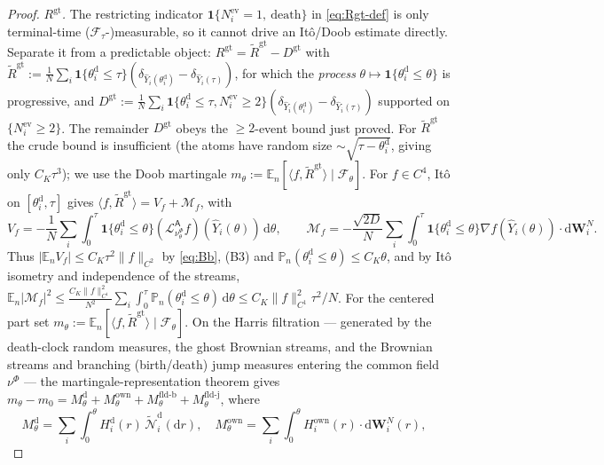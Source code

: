 \documentclass[a4paper,fleqn]{cas-sc}
\newcommand{\mhyphen}{\text{-}}
\theoremstyle{definition}
\theoremstyle{remark}
\begin{document}
\begin{proof}
\emph{$R^{\mathrm{gt}}$.} The restricting indicator $\mathbf 1\{N^{\mathrm{ev}}_i=1,\ \text{death}\}$
in \eqref{eq:Rgt-def} is only terminal-time ($\mathcal F_\tau$-)measurable, so it cannot drive
an It\^o/Doob estimate directly. Separate it from a predictable object:
$R^{\mathrm{gt}}=\widetilde R^{\mathrm{gt}}-D^{\mathrm{gt}}$ with
$\widetilde R^{\mathrm{gt}}:=\frac1N\sum_i\mathbf 1\{\theta^{\mathrm d}_i\le\tau\}(\delta_{\widehat Y_i(\theta^{\mathrm d}_i)}-\delta_{\widehat Y_i(\tau)})$,
for which the \emph{process} $\theta\mapsto\mathbf 1\{\theta^{\mathrm d}_i\le\theta\}$ is
progressive, and $D^{\mathrm{gt}}:=\frac1N\sum_i\mathbf 1\{\theta^{\mathrm d}_i\le\tau,N^{\mathrm{ev}}_i\ge2\}(\delta_{\widehat Y_i(\theta^{\mathrm d}_i)}-\delta_{\widehat Y_i(\tau)})$
supported on $\{N^{\mathrm{ev}}_i\ge2\}$. The remainder $D^{\mathrm{gt}}$ obeys the $\ge2$-event bound
just proved. For $\widetilde R^{\mathrm{gt}}$ the crude bound is insufficient (the atoms
have random size $\sim\sqrt{\tau-\theta^{\mathrm d}_i}$, giving only $C_K\tau^3$); we use the
Doob martingale $m_\theta:=\mathbb E_n[\langle f,\widetilde R^{\mathrm{gt}}\rangle\mid\mathcal F_\theta]$.
For $f\in C^4$, It\^o on $[\theta^{\mathrm d}_i,\tau]$ gives
$\langle f,\widetilde R^{\mathrm{gt}}\rangle=V_f+\mathcal M_f$, with
\[
V_f=-\frac1N\sum_i\int_0^\tau\mathbf 1\{\theta^{\mathrm d}_i\le\theta\}
(\mathcal L^{\mathsf A}_{\nu^\Phi_\theta}f)(\widehat Y_i(\theta))\,\mathrm d\theta,\qquad
\mathcal M_f=-\frac{\sqrt{2D}}N\sum_i\int_0^\tau\mathbf 1\{\theta^{\mathrm d}_i\le\theta\}
\nabla f(\widehat Y_i(\theta))\!\cdot\!\mathrm d\mathbf W^N_i .
\]
Thus $|\mathbb E_nV_f|\le C_K\tau^2\|f\|_{C^2}$ by \eqref{eq:Bb}, (B3) and
$\mathbb P_n(\theta^{\mathrm d}_i\le\theta)\le C_K\theta$, and by It\^o isometry and independence of the streams,
$\mathbb E_n|\mathcal M_f|^2\le\frac{C_K\|f\|_{C^1}^2}{N^2}\sum_i\int_0^\tau\mathbb P_n(\theta^{\mathrm d}_i\le\theta)\,\mathrm d\theta\le C_K\|f\|_{C^1}^2\tau^2/N$.
For the centered part set $m_\theta:=\mathbb E_n[\langle f,\widetilde R^{\mathrm{gt}}\rangle\mid\mathcal F_\theta]$.
On the Harris filtration --- generated by the death-clock random measures, the ghost Brownian
streams, and the Brownian streams and branching (birth/death) jump measures entering the common
field $\nu^\Phi$ --- the martingale-representation theorem gives
$m_\theta-m_0=M^{\mathrm d}_\theta+M^{\mathrm{own}}_\theta+M^{\mathrm{fld\mhyphen b}}_\theta+M^{\mathrm{fld\mhyphen j}}_\theta$, where
\[
M^{\mathrm d}_\theta=\sum_i\int_0^\theta H^{\mathrm d}_i(r)\,\widetilde{\mathcal N}^{\mathrm d}_i(\mathrm dr),\quad
M^{\mathrm{own}}_\theta=\sum_i\int_0^\theta H^{\mathrm{own}}_i(r)\!\cdot\!\mathrm d\mathbf W^N_i(r),\quad
\]
\end{proof}
\end{document}
